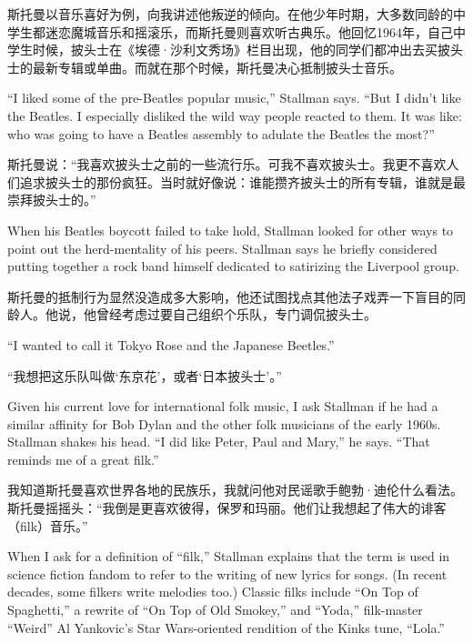 \ifdefined\chs
斯托曼以音乐喜好为例，向我讲述他叛逆的倾向。在他少年时期，大多数同龄的中学生都迷恋魔城音乐和摇滚乐，而斯托曼则喜欢听古典乐。他回忆1964年，自己中学生时候，披头士在《埃德·沙利文秀场》栏目出现，他的同学们都冲出去买披头士的最新专辑或单曲。而就在那个时候，斯托曼决心抵制披头士音乐。
\fi

\ifdefined\eng
``I liked some of the pre-Beatles popular music,'' Stallman says. ``But I didn't like the Beatles. I especially disliked the wild way people reacted to them. It was like: who was going to have a Beatles assembly to adulate the Beatles the most?''
\fi

\ifdefined\chs
斯托曼说：``我喜欢披头士之前的一些流行乐。可我不喜欢披头士。我更不喜欢人们追求披头士的那份疯狂。当时就好像说：谁能攒齐披头士的所有专辑，谁就是最崇拜披头士的。''
\fi

\ifdefined\eng
When his Beatles boycott failed to take hold, Stallman looked for other ways to point out the herd-mentality of his peers. Stallman says he briefly considered putting together a rock band himself dedicated to satirizing the Liverpool group.
\fi

\ifdefined\chs
斯托曼的抵制行为显然没造成多大影响，他还试图找点其他法子戏弄一下盲目的同龄人。他说，他曾经考虑过要自己组织个乐队，专门调侃披头士。
\fi

\ifdefined\eng
``I wanted to call it Tokyo Rose and the Japanese Beetles.''
\fi

\ifdefined\chs
``我想把这乐队叫做`东京花'，或者`日本披头士'。''
\fi

\ifdefined\eng
Given his current love for international folk music, I ask Stallman if he had a similar affinity for Bob Dylan and the other folk musicians of the early 1960s. Stallman shakes his head. ``I did like Peter, Paul and Mary,'' he says. ``That reminds me of a great filk.''
\fi

\ifdefined\chs
我知道斯托曼喜欢世界各地的民族乐，我就问他对民谣歌手鲍勃·迪伦什么看法。斯托曼摇摇头：``我倒是更喜欢彼得，保罗和玛丽。他们让我想起了伟大的诽客（filk）音乐。''
\fi

\ifdefined\eng
When I ask for a definition of ``filk,'' Stallman explains that the term is used in science fiction fandom to refer to the writing of new lyrics for songs.  (In recent decades, some filkers write melodies too.)  Classic filks include ``On Top of Spaghetti,'' a rewrite of ``On Top of Old Smokey,'' and ``Yoda,'' filk-master ``Weird'' Al Yankovic's Star Wars-oriented rendition of the Kinks tune, ``Lola.''
\fi

